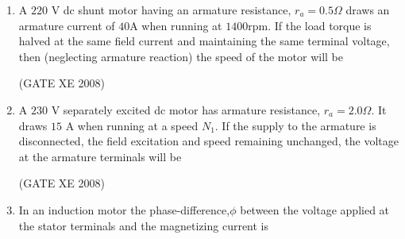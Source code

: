 \documentclass[12pt]{article}
\begin{document}
\begin{enumerate}
\begin{enumerate}
\end{enumerate}

(GATE XE 2008)
\item A $220$ V dc shunt motor having an armature resistance, $r_{a}=0.5\Omega$ draws an armature current of $40$A when running at $1400$rpm. If the load torque is halved at the same field current and maintaining the same terminal voltage, then (neglecting armature reaction) the speed of the motor will be

\begin{enumerate}
\end{enumerate}

(GATE XE 2008)
\item A $230$ V separately excited dc motor has armature resistance, $r_{a} = 2.0\Omega$. It draws $15$ A when running at a speed $N_{1}$. If the supply to the armature is disconnected, the field excitation and speed remaining unchanged, the voltage at the armature terminals will be

\begin{enumerate}
\end{enumerate}

(GATE XE 2008)
\item In an induction motor the phase-difference,$\phi$ between the voltage applied at the stator terminals and the magnetizing current is

\begin{enumerate}
\end{enumerate}


\end{enumerate}
\end{document}

